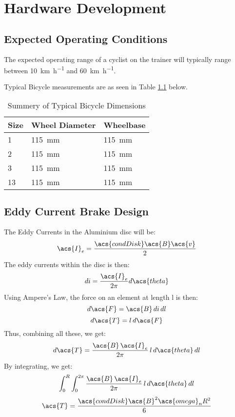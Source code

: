 
\chapter{Hardware Development}

\section{Expected Operating Conditions}
The expected operating range of a cyclist on the trainer will typically range between \SI{10}{\kilo\meter\per\hour} and \SI{60}{\kilo\meter\per\hour}.

Typical Bicycle measurements are as seen in Table \ref{tab:bikesize} below.

\begin{table}[H]
	\renewcommand{\arraystretch}{1.2}
	\centering
	\caption{Summery of Typical Bicycle Dimensions}
	\begin{tabularx}{\textwidth}{p{1.4cm} >{\raggedright}p{5cm} >{\raggedright\arraybackslash}X}
		\toprule
		Size & Wheel Diameter & Wheelbase\\
		\midrule
		1 & \SI{115}{\milli\meter} & \SI{115}{\milli\meter}\\
		2 & \SI{115}{\milli\meter} & \SI{115}{\milli\meter}\\
		3 & \SI{115}{\milli\meter} & \SI{115}{\milli\meter}\\
		13 & \SI{115}{\milli\meter} & \SI{115}{\milli\meter}\\
		\bottomrule
	\end{tabularx}
	\label{tab:bikesize}
\end{table}

\newpage
\section{Eddy Current Brake Design}

The Eddy Currents in the Aluminium disc will be:
\[
	\acs{I}_e = \frac{\acs{condDisk} \acs{B} \acs{v}}{2}
\]
The eddy currents within the disc is then:
\[
	di = \frac{\acs{I}_e}{2 \pi} d\acs{theta}
\]
Using Ampere's Law, the force on an element at length l is then:
\[
	d\acs{F} = \acs{B} \, di \, dl
\]
\[
	d\acs{T} = l \, d\acs{F}
\]
Thus, combining all these, we get:
\[
	d\acs{T} = \frac{\acs{B} \, \acs{I}_e}{2 \pi} \, l \, d\acs{theta} \, dl
\]
By integrating, we get:
\[
	\int_{0}^{R} \int_{0}^{2 \pi} \frac{\acs{B} \, \acs{I}_e}{2 \pi} \, l \, d\acs{theta} \, dl
\]
\[
	\acs{T} = \frac{\acs{condDisk}\acs{B}^2\acs{omega}_n R^2}{6}
\]


